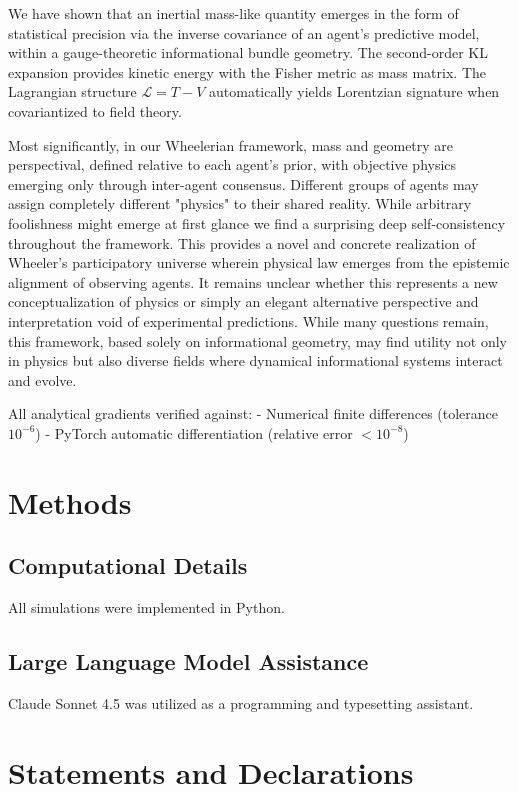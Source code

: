 \documentclass[11pt]{article}
\begin{document}
We have shown that an inertial mass-like quantity emerges in the form of statistical precision via the inverse covariance of an agent's predictive model, within a gauge-theoretic informational bundle geometry. The second-order KL expansion provides kinetic energy with the Fisher metric as mass matrix. The Lagrangian structure $\mathcal{L} = T - V$ automatically yields Lorentzian signature when covariantized to field theory.

Most significantly, in our Wheelerian framework, mass and geometry are perspectival, defined relative to each agent's prior, with objective physics emerging only through inter-agent consensus. Different groups of agents may assign completely different "physics" to their shared reality.  While arbitrary foolishness might emerge at first glance we find a surprising deep self-consistency throughout the framework.  This provides a novel and concrete realization of Wheeler's participatory universe wherein physical law emerges from the epistemic alignment of observing agents. It remains unclear whether this represents a new conceptualization of physics or simply an elegant alternative perspective and interpretation void of experimental predictions.  While many questions remain, this framework, based solely on informational geometry, may find utility not only in physics but also diverse fields where dynamical informational systems interact and evolve.

All analytical gradients verified against:
- Numerical finite differences (tolerance $10^{-6}$)
- PyTorch automatic differentiation (relative error $< 10^{-8}$)

\section{Methods}
\subsection{Computational Details}
All simulations were implemented in Python.

\subsection{Large Language Model Assistance}
Claude Sonnet 4.5 was utilized as a programming and typesetting assistant.


\section*{Statements and Declarations}
\end{document}
